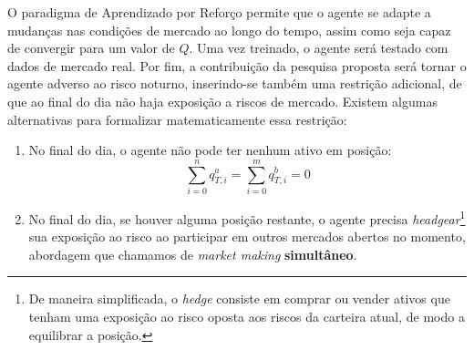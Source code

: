 O paradigma de Aprendizado por Reforço permite que o agente se adapte a mudanças nas condições de mercado ao longo do tempo, assim como seja capaz de convergir para um valor de $Q$. Uma vez treinado, o agente será testado com dados de mercado real. Por fim, a contribuição da pesquisa proposta será tornar o agente adverso ao risco noturno, inserindo-se também uma restrição adicional, de que ao final do dia não haja exposição a riscos de mercado. 
Existem algumas alternativas para formalizar matematicamente essa restrição:
\begin{enumerate}
    \item No final do dia, o agente não pode ter nenhum ativo em posição: 
    \begin{equation} \label{overnight_restriction}
        \sum_{i = 0}^{n} q_{T, i}^{a}  = \sum_{i=0}^{m} q_{T, i}^{b} = 0
    \end{equation}
    \item No final do dia, se houver alguma posição restante, o agente precisa \textit{headgear}\footnote{De maneira simplificada, o \textit{hedge} consiste em comprar ou vender ativos que tenham uma exposição ao risco oposta aos riscos da carteira atual, de modo a equilibrar a posição.} sua exposição ao risco ao participar em outros mercados abertos no momento, abordagem que chamamos de \textit{market making} \textbf{simultâneo}.
\end{enumerate}
